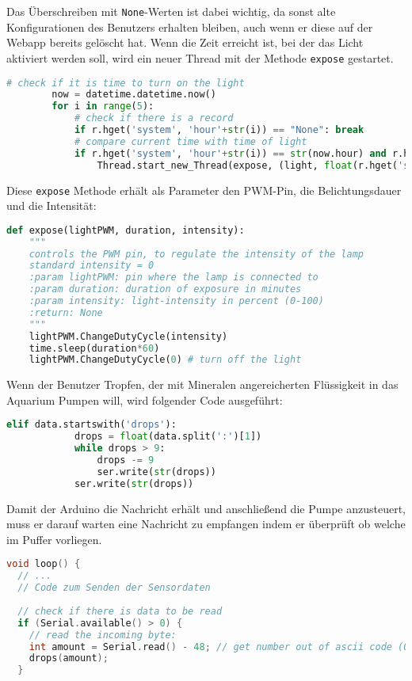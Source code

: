 Das Überschreiben mit \texttt{None}-Werten ist dabei wichtig, da sonst alte Konfigurationen des Benutzers erhalten bleiben, auch wenn er diese auf der Webapp bereits gelöscht hat.
\newpage
Wenn die Zeit erreicht ist, bei der das Licht aktiviert werden soll, wird ein neuer Thread mit der Methode \texttt{expose} gestartet.
\begin{lstlisting}[language=Python, caption=Aktivieren der Pflanzenbeleuchtung]
        # check if it is time to turn on the light
        now = datetime.datetime.now()
        for i in range(5):
            # check if there is a record
            if r.hget('system', 'hour'+str(i)) == "None": break
            # compare current time with time of light
            if r.hget('system', 'hour'+str(i)) == str(now.hour) and r.hget('system', 'minute'+str(i)) == str(now.minute):
                Thread.start_new_Thread(expose, (light, float(r.hget('system', 'duration'+str(i))), float(r.hget('system', 'intensity'+str(i)))))
\end{lstlisting}
Diese \texttt{expose} Methode erhält als Parameter den \gls{PWM}-Pin, die Belichtungsdauer und die Intensität:
\begin{lstlisting}[language=Python, caption=Steuern des \gls{PWM} Pins]
def expose(lightPWM, duration, intensity):
    """
    controls the PWM pin, to regulate the intensity of the lamp
    standard intensity = 0
    :param lightPWM: pin where the lamp is connected to
    :param duration: duration of exposure in minutes
    :param intensity: light-intensity in percent (0-100)
    :return: None
    """
    lightPWM.ChangeDutyCycle(intensity)
    time.sleep(duration*60)
    lightPWM.ChangeDutyCycle(0) # turn off the light
\end{lstlisting}
\newpage
Wenn der Benutzer Tropfen, der mit Mineralen angereicherten Flüssigkeit in das Aquarium Pumpen will, wird folgender Code ausgeführt:
\begin{lstlisting}[language=Python, caption=Ansteuern der Peristaltikpumpe (Pi)]
        elif data.startswith('drops'):
            drops = float(data.split(':')[1])
            while drops > 9:
                drops -= 9
                ser.write(str(drops))
            ser.write(str(drops))
\end{lstlisting}
Damit der Arduino die Nachricht erhält und anschließend die Pumpe anzusteuert, muss er darauf warten eine Nachricht zu empfangen indem er überprüft ob welche im Puffer vorliegen. 
\begin{lstlisting}[language=C, caption=Auf eingehende Nachrichten warten (Arduino)]
void loop() {
  // ...
  // Code zum Senden der Sensordaten
  
  // check if there is data to be read
  if (Serial.available() > 0) {
    // read the incoming byte:
    int amount = Serial.read() - 48; // get number out of ascii code (0 = 48, 1 = 49, etc)
    drops(amount);
  }
\end{lstlisting}
